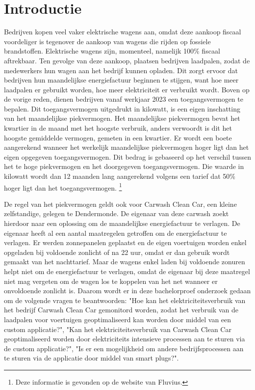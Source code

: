 
\section{Introductie}%
\label{sec:introductie}

Bedrijven kopen veel vaker elektrische wagens aan, omdat deze aankoop fiscaal voordeliger is tegenover de aankoop van wagens die rijden op fossiele brandstoffen. Elektrische wagens zijn, momenteel, namelijk 100\% fiscaal aftrekbaar. Ten gevolge van deze aankoop, plaatsen bedrijven laadpalen, zodat de medewerkers hun wagen aan het bedrijf kunnen opladen. Dit zorgt ervoor dat bedrijven hun maandelijkse energiefactuur beginnen te stijgen, want hoe meer laadpalen er gebruikt worden, hoe meer elektriciteit er verbruikt wordt. Boven op de vorige reden, dienen bedrijven vanaf werkjaar 2023 een toegangsvermogen te bepalen. Dit toegangsvermogen uitgedrukt in kilowatt, is een eigen inschatting van het maandelijkse piekvermogen. Het maandelijkse piekvermogen bevat het kwartier in de maand met het hoogste verbruik, anders verwoordt is dit het hoogste gemiddelde vermogen, gemeten in een kwartier. Er wordt een boete aangerekend wanneer het werkelijk maandelijkse piekvermogen hoger ligt dan het eigen opgegeven toegangsvermogen. Dit bedrag is gebaseerd op het verschil tussen het te hoge piekvermogen en het doorgegeven toegangsvermogen. Die waarde in kilowatt wordt dan 12 maanden lang aangerekend volgens een tarief dat 50\% hoger ligt dan het toegangsvermogen. \footnote{Deze informatie is gevonden op de website van Fluvius.}

De regel van het piekvermogen geldt ook voor Carwash Clean Car, een kleine zelfstandige, gelegen te Dendermonde. De eigenaar van deze carwash zoekt hierdoor naar een oplossing om de maandelijkse energiefactuur te verlagen. De eigenaar heeft al een aantal maatregelen getroffen om de energiefactuur te verlagen. Er werden zonnepanelen geplaatst en de eigen voertuigen worden enkel opgeladen bij voldoende zonlicht of na 22 uur, omdat er dan gebruik wordt gemaakt van het nachttarief. Maar de wagens enkel laden bij voldoende zonuren helpt niet om de energiefactuur te verlagen, omdat de eigenaar bij deze maatregel niet mag vergeten om de wagen los te koppelen van het net wanneer er onvoldoende zonlicht is. Daarom wordt er in deze bachelorproef onderzoek gedaan om de volgende vragen te beantwoorden: "Hoe kan het elektriciteitsverbruik van het bedrijf Carwash Clean Car gemonitord worden, zodat het verbruik van de laadpalen voor voertuigen geoptimaliseerd kan worden door middel van een custom applicatie?", "Kan het elektriciteitsverbruik van Carwash Clean Car geoptimaliseerd worden door elektriciteits intensieve processen aan te sturen via de custom applicatie?", "Is er een mogelijkheid om andere bedrijfsprocessen aan te sturen via de applicatie door middel van smart plugs?".

